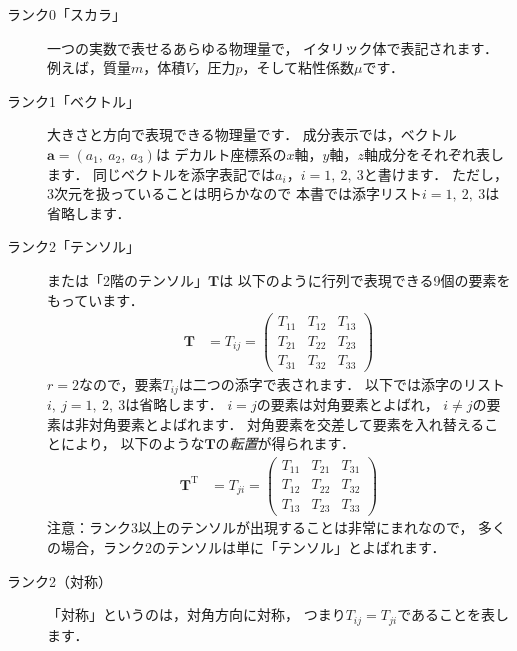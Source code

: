 \begin{description}
 \item[ランク0「スカラ」] 一つの実数で表せるあらゆる物理量で，
            イタリック体で表記されます．
            例えば，質量$m$，体積$V$，圧力$p$，そして粘性係数$\mu$です．
 \item[ランク1「ベクトル」] 大きさと方向で表現できる物理量です．
            成分表示では，ベクトル$\bm{a} = (a_{1},\ a_{2},\ a_{3})$は
            デカルト座標系の$x$軸，$y$軸，$z$軸成分をそれぞれ表します．
            同じベクトルを添字表記では$a_{i}$，$i = 1,\ 2,\ 3$と書けます．
            ただし，3次元を扱っていることは明らかなので
            本書では添字リスト$i = 1,\ 2,\ 3$は省略します．
 \item[ランク2「テンソル」] または「2階のテンソル」$\bm{T}$は
            以下のように行列で表現できる9\nobreak 個の要素をもっています．
            \begin{align}
             \label{eq:1.1}
             \bm{T} &= T_{ij}
             = \begin{pmatrix}
                T_{11} & T_{12} & T_{13} \\
                T_{21} & T_{22} & T_{23} \\
                T_{31} & T_{32} & T_{33}
               \end{pmatrix}
            \end{align}
            $r = 2$なので，要素$T_{ij}$は二つの添字で表されます．
            以下では添字のリスト$i,\ j = 1,\ 2,\ 3$は省略します．
            $i = j$の要素は対角要素とよばれ，
            $i \ne j$の要素は非対角要素とよばれます．
            対角要素を交差して要素を入れ替えることにより，
            以下のような$\bm{T}$の\emph{転置}が得られます．
            \begin{align}
             \label{eq:1.2}
             \bm{T}^{\mathrm{T}} &= T_{ji}
             = \begin{pmatrix}
                T_{11} & T_{21} & T_{31} \\
                T_{12} & T_{22} & T_{32} \\
                T_{13} & T_{23} & T_{33}
               \end{pmatrix}
            \end{align}
            注意：ランク3以上のテンソルが出現することは非常にまれなので，
            多くの場合，ランク2のテンソルは単に「テンソル」とよばれます．
 \item[ランク2（対称）] 「対称」というのは，対角方向に対称，
            つまり$T_{ij} = T_{ji}$であることを表します．

\end{description}
